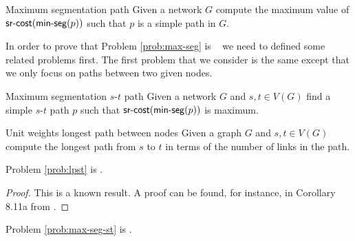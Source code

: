 
\begin{problem}{Maximum segmentation path}
\label{prob:max-seg}
Given a network $G$ compute the maximum value of $\textsf{sr-cost}(\textsf{min-seg}(p))$ such that $p$ is a simple path in $G$.
\end{problem}

In order to prove that Problem \ref{prob:max-seg} is \NPhard~ we need to defined some related problems first.
The first problem that we consider is the same except that we only focus on paths between two given nodes.

\begin{problem}{Maximum segmentation $s$-$t$ path}
\label{prob:max-seg-st}
Given a network $G$ and $s, t \in V(G)$ find a simple $s$-$t$ path $p$ such that $\textsf{sr-cost}(\textsf{min-seg}(p))$ is maximum.
\end{problem}


\begin{problem}{Unit weights longest path between nodes}
\label{prob:lpst}
Given a graph $G$ and $s, t \in V(G)$ compute the longest path from $s$ to $t$ in terms of the number of links
in the path.
\end{problem}

\begin{theorem}
Problem \ref{prob:lpst} is \NPhard. 
\end{theorem}

\begin{proof}
This is a known result. A proof can be found, for instance, in Corollary 8.11a from \cite{schrijver-book}.
\end{proof}

\begin{theorem}
\label{thm:max-seg-st-np}
Problem \ref{prob:max-seg-st} is \NPhard. 
\end{theorem}

